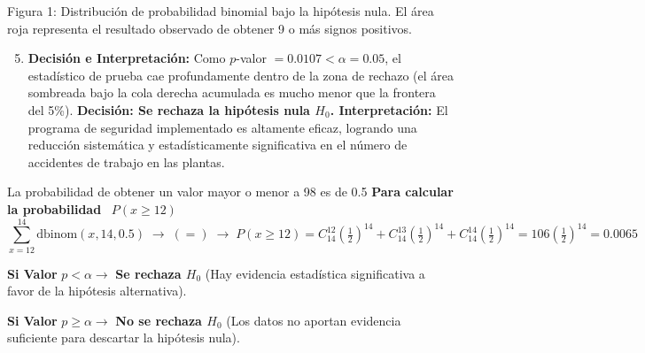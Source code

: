 \documentclass[10pt,a4paper]{article}
\begin{document}
\begin{center}
\vspace{-4pt}
\vspace{-10pt}

{\scriptsize Figura 1: Distribución de probabilidad binomial bajo la hipótesis nula. El área roja representa el resultado observado de obtener 9 o más signos positivos.}
\vspace{-4pt}
\end{center}

\begin{enumerate}[leftmargin=18pt,itemsep=2pt,topsep=2pt,parsep=0pt]
  \setcounter{enumi}{4}
  \item \textbf{Decisión e Interpretación:} Como $p$-valor $= 0.0107 < \alpha = 0.05$, el estadístico de prueba cae profundamente dentro de la zona de rechazo (el área sombreada bajo la cola derecha acumulada es mucho menor que la frontera del 5\%). \textbf{Decisión: Se rechaza la hipótesis nula $H_0$. Interpretación:} El programa de seguridad implementado es altamente eficaz, logrando una reducción sistemática y estadísticamente significativa en el número de accidentes de trabajo en las plantas.
\end{enumerate}

La probabilidad de obtener un valor mayor o menor a 98 es de 0.5 \quad \textbf{Para calcular la probabilidad} \ $P(x \geq 12)$
{\small
\[
\textstyle\sum_{x=12}^{14} \text{dbinom}(x, 14, 0.5)
\;\longrightarrow\; (=) \;\longrightarrow\;
P(x \geq 12) = C_{14}^{12}\left(\tfrac{1}{2}\right)^{14} + C_{14}^{13}\left(\tfrac{1}{2}\right)^{14} + C_{14}^{14}\left(\tfrac{1}{2}\right)^{14} = 106\left(\tfrac{1}{2}\right)^{14} = 0.0065
\]
}

\colorbox{gray!8}{\parbox{\textwidth}{%
\textbf{Si Valor} $p < \alpha \rightarrow$ \textbf{Se rechaza $H_0$} (Hay evidencia estadística significativa a favor de la hipótesis alternativa).

\textbf{Si Valor} $p \geq \alpha \rightarrow$ \textbf{No se rechaza $H_0$} (Los datos no aportan evidencia suficiente para descartar la hipótesis nula).
}}
\end{document}
